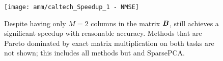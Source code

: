 \begin{figure}[h]
\begin{center}
\texttt{[image: amm/caltech\_Speedup\_1 - NMSE]}
\caption{Despite having only $M=2$ columns in the matrix $\bm{B}$, \oursp still achieves a significant speedup with reasonable accuracy. Methods that are Pareto dominated by exact matrix multiplication on both tasks are not shown; this includes all methods but \oursp and SparsePCA.} %
\label{fig:caltech}
\end{center}
\end{figure}


